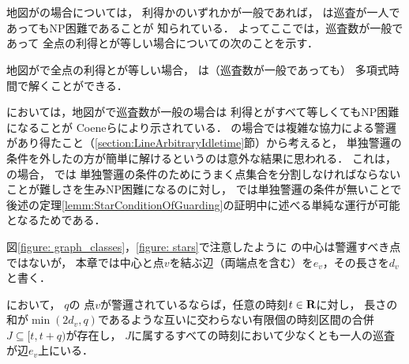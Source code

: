 \chapter{{\graphStar}}
\label{chapter: star}

地図が{\graphStar}の場合については，
利得か{\maxIdletime}のいずれかが一般であれば，
{\patProb}は巡査が一人であってもNP困難であることが
知られている\cite[Theorems 5 and 6]{coene2011charlemagne}．
よってここでは，巡査数が一般であって
全点の利得と{\maxIdletime}が等しい場合についての次のことを示す．

\begin{theo}
  \label{theo:StarUnaryProfitAndIdletime}
  地図が{\graphStar}で全点の利得と{\maxIdletime}が等しい場合，
  {\patProb}は（巡査数が一般であっても）
  多項式時間で解くことができる．
\end{theo}

{\independentPatProb}においては，地図が{\graphStar}で巡査数が一般の場合は
利得と{\maxIdletime}がすべて等しくてもNP困難になることが
Coeneらにより示されている\cite[Theorem~10]{coene2011charlemagne}．
{\graphLine}の場合では複雑な協力による警邏があり得たこと（\ref{section:LineArbitraryIdletime}節）から考えると，
単独警邏の条件を外した{\patProb}の方が簡単に解けるというのは意外な結果に思われる．
これは，
{\graphStar}の場合，
{\independentPatProb}では
単独警邏の条件のためにうまく点集合を分割しなければならないことが難しさを生みNP困難になるのに対し，
{\patProb}では単独警邏の条件が無いことで
後述の定理\ref{lemm:StarConditionOfGuarding}の証明中に述べる単純な運行が可能となるためである．

図\ref{figure: graph_classes}，\ref{figure: stars}で注意したように
{\graphStar}の中心は警邏すべき点ではないが，
本章では中心と点$v$を結ぶ辺（両端点を含む）を$e_v$，その長さを$d_v$と書く．

\begin{lemm}
  \label{lemm:StarCostOfVertex}
  {\graphStar}において，
  {\maxIdletime}$q$の
  点$v$が警邏されているならば，任意の時刻$t \in \mathbf R$に対し，
  長さの和が$\min(2d_v, q)$であるような互いに交わらない有限個の時刻区間の合併$J \subseteq [t, t + q)$が存在し，
  $J$に属するすべての時刻において少なくとも一人の巡査が辺$e_v$上にいる．
\end{lemm}

